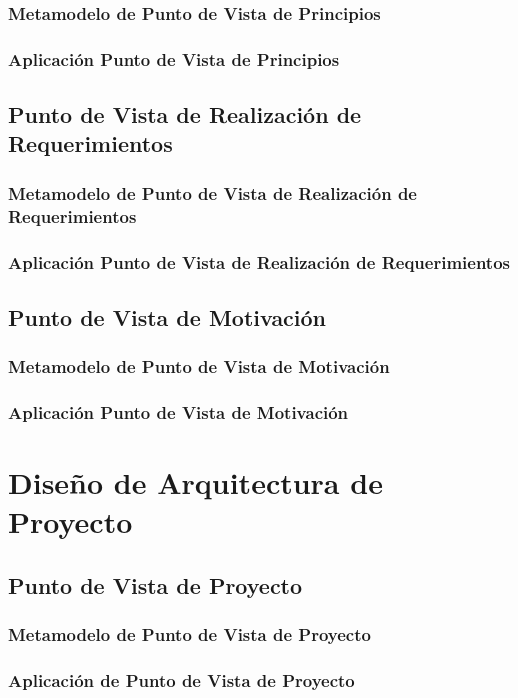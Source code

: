       \subsubsection{Metamodelo de Punto de Vista de Principios}
      \subsubsection{Aplicación Punto de Vista de Principios}
      \subsection{Punto de Vista de Realización de Requerimientos}
      \subsubsection{Metamodelo de Punto de Vista de Realización de Requerimientos}
      \subsubsection{Aplicación Punto de Vista de Realización de Requerimientos}
      \subsection{Punto de Vista de Motivación}
      \subsubsection{Metamodelo de Punto de Vista de Motivación}
      \subsubsection{Aplicación Punto de Vista de Motivación}
     \section{Diseño de Arquitectura de Proyecto}
      \subsection{Punto de Vista de Proyecto}
      \subsubsection{Metamodelo de Punto de Vista de Proyecto}
      \subsubsection{Aplicación de Punto de Vista de Proyecto}
